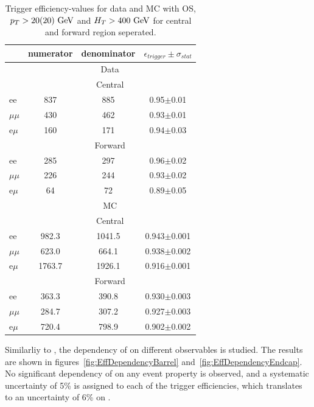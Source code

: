 \begin{table}[hbp]
  \begin{center}
  \caption{
    Trigger efficiency-values for data and MC with OS, $p_T>20(20)\,\,\text{Ge\hspace{-.08em}V}$
    and $H_T>400\,\,\text{Ge\hspace{-.08em}V}$ for central and forward region seperated.
  } 
  \begin{tabular}{l|c|c|c}     
    & numerator & denominator & $\epsilon_{trigger} \pm \sigma_{stat}$  \\ 
    \hline
    &\multicolumn{3}{c}{Data} \\
    \hline
    &  \multicolumn{3}{|c}{ Central } \\
    \hline
    ee       & 837 & 885 & 0.95$\pm$0.01  \\
    $\mu\mu$ & 430 & 462 & 0.93$\pm$0.01  \\
    e$\mu$   & 160 & 171 & 0.94$\pm$0.03  \\        
    \hline 
    &  \multicolumn{3}{|c}{ Forward } \\
    \hline
    ee       & 285 & 297 & 0.96$\pm$0.02  \\
    $\mu\mu$ & 226 & 244 & 0.93$\pm$0.02  \\
    e$\mu$   &  64 &  72 & 0.89$\pm$0.05  \\
    \hline
    \hline
    & \multicolumn{3}{c}{MC} \\
    \hline
    & \multicolumn{3}{|c}{ Central } \\
    \hline 
    ee       &  982.3 & 1041.5 & 0.943$\pm$0.001 \\
    $\mu\mu$ &  623.0 &  664.1 & 0.938$\pm$0.002 \\
    e$\mu$   & 1763.7 & 1926.1 & 0.916$\pm$0.001 \\    
    \hline 
    & \multicolumn{3}{|c}{ Forward } \\
    \hline 
    ee       &  363.3 & 390.8 & 0.930$\pm$0.003 \\
    $\mu\mu$ &  284.7 & 307.2 & 0.927$\pm$0.003 \\
    e$\mu$   &  720.4 & 798.9 & 0.902$\pm$0.002 \\    
    \hline 
    \hline
  \end{tabular}  
  \label{tab:EffValues_Seperated}
  \end{center}
\end{table}	

Similarliy to \rmue, the dependency of \rt on different observables is studied.
The results are shown in figures~\ref{fig:EffDependencyBarrel} and~\ref{fig:EffDependencyEndcap}.
No significant dependency of \rt on any event property is observed,
and a systematic uncertainty of 5\% is assigned to each of the trigger efficiencies,
which translates to an uncertainty of 6\% on \rt.

